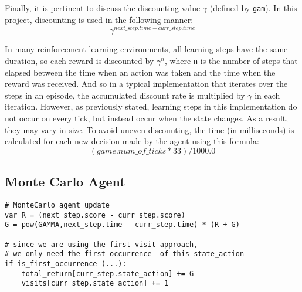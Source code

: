 Finally, it is pertinent to discuss the discounting value $\gamma$ (defined by \texttt{gam}). In this project, discounting is used in the following manner: $$\gamma^{next\_step.time - curr\_step.time}$$

In many reinforcement learning environments, all learning steps have the same duration, so each reward is discounted by $\gamma^{n}$, where \texttt{n} is the number of steps that elapsed between the time when an action was taken and the time when the reward was received.  And so in a typical implementation that iterates over the steps in an episode, the accumulated discount rate is multiplied by $\gamma$ in each iteration. However, as previously stated, learning steps in this implementation do not occur on every tick, but instead occur when the state changes. As a result, they may vary in size. To avoid uneven discounting, the time (in milliseconds) is calculated for each new decision made by the agent using this formula:  $$(game.num\_of\_ticks * 33) / 1000.0$$

\subsection{Monte Carlo Agent}

\begin{center}
\hrulefill
\begin{lstlisting}
# MonteCarlo agent update
var R = (next_step.score - curr_step.score)
G = pow(GAMMA,next_step.time - curr_step.time) * (R + G)
            
# since we are using the first visit approach,
# we only need the first occurrence  of this state_action
if is_first_occurrence (...):
    total_return[curr_step.state_action] += G
    visits[curr_step.state_action] += 1
\end{lstlisting}
\hrulefill
\end{center}

